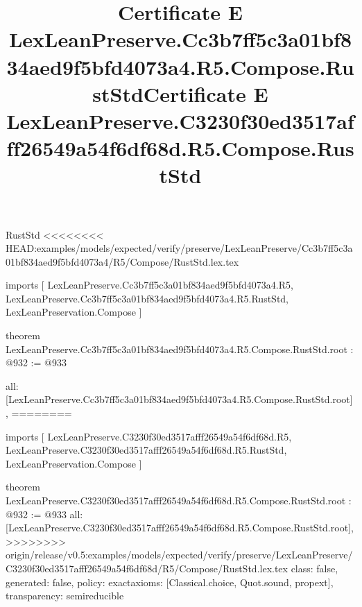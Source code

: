 \begin{lexlean}{RustStd}
<<<<<<<< HEAD:examples/models/expected/verify/preserve/LexLeanPreserve/Cc3b7ff5c3a01bf834aed9f5bfd4073a4/R5/Compose/RustStd.lex.tex
\title{Certificate E LexLeanPreserve.Cc3b7ff5c3a01bf834aed9f5bfd4073a4.R5.Compose.RustStd}
\begin{coremodule}
imports [
  LexLeanPreserve.Cc3b7ff5c3a01bf834aed9f5bfd4073a4.R5,
  LexLeanPreserve.Cc3b7ff5c3a01bf834aed9f5bfd4073a4.R5.RustStd,
  LexLeanPreservation.Compose
]

theorem LexLeanPreserve.Cc3b7ff5c3a01bf834aed9f5bfd4073a4.R5.Compose.RustStd.root : @932 := @933 {
  all: [LexLeanPreserve.Cc3b7ff5c3a01bf834aed9f5bfd4073a4.R5.Compose.RustStd.root],
========
\title{Certificate E LexLeanPreserve.C3230f30ed3517afff26549a54f6df68d.R5.Compose.RustStd}
\begin{coremodule}
imports [
  LexLeanPreserve.C3230f30ed3517afff26549a54f6df68d.R5,
  LexLeanPreserve.C3230f30ed3517afff26549a54f6df68d.R5.RustStd,
  LexLeanPreservation.Compose
]

theorem LexLeanPreserve.C3230f30ed3517afff26549a54f6df68d.R5.Compose.RustStd.root : @932 := @933 {
  all: [LexLeanPreserve.C3230f30ed3517afff26549a54f6df68d.R5.Compose.RustStd.root],
>>>>>>>> origin/release/v0.5:examples/models/expected/verify/preserve/LexLeanPreserve/C3230f30ed3517afff26549a54f6df68d/R5/Compose/RustStd.lex.tex
  class: false,
  generated: false,
  policy: exact{axioms: [Classical.choice, Quot.sound, propext]},
  transparency: semireducible
}


\end{coremodule}}
\end{coremodule}
\end{lexlean}
